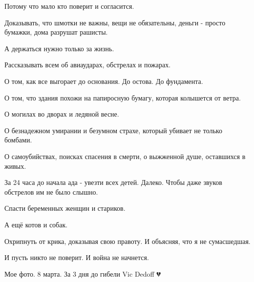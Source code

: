 Потому что мало кто  поверит и согласится. 

Доказывать, что шмотки не важны, вещи не обязательны,  деньги - просто бумажки,
дома разрушат рашисты. 

А  держаться нужно только  за жизнь. 

Рассказывать всем об авиаударах, обстрелах и пожарах.

О том, как  все выгорает до основания. До остова.  До фундамента.  

О том, что  здания похожи на папиросную бумагу, которая колышется от ветра. 

О могилах во дворах и ледяной весне.  

О безнадежном умирании и безумном страхе, который убивает не только бомбами. 

О самоубийствах, поисках   спасения  в смерти, о выжженной душе,  оставшихся в
живых. 

За 24 часа до начала ада -  увезти всех  детей.  Далеко. Чтобы даже звуков
обстрелов  им не было слышно.  

Спасти беременных женщин и стариков. 

А ещё котов и собак. 

Охрипнуть от крика, доказывая свою правоту.  И объясняя, что я не сумасшедшая. 

И пусть никто не  поверит.  И  война не начнется.

Мое фото. 8 марта. За 3 дня до гибели Vic Dedoff 💔

